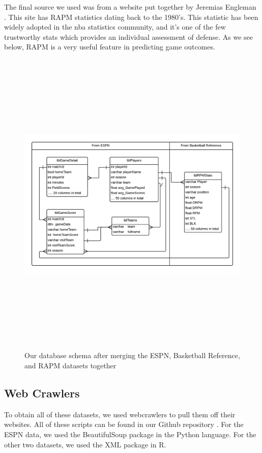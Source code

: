 \documentclass{article}
\begin{document}
	The final source we used was from a website put together by Jeremias Engleman \cite{rpm_data}. This site has RAPM statistics dating back to the 1980's. This statistic has been widely adopted in the nba statistics community, and it's one of the few trustworthy stats which provides an individual assessment of defense. As we see below, RAPM is a very useful feature in predicting game outcomes. \\

	\begin{figure}
		\centering
		\includegraphics[width=150mm, height=150mm]{sqliteERDiagram.png}	
		\caption{Our database schema after merging the ESPN, Basketball Reference, and RAPM datasets together}
		\label{fig:database}
	\end{figure}

	\subsection{Web Crawlers}
	To obtain all of these datasets, we used webcrawlers to pull them off their websites. All of these scripts can be found in our Github repository \cite{gitrepo}. For the ESPN data, we used the BeautifulSoup package in the Python language. For the other two datasets, we used the XML package in R. \\
\end{document}
